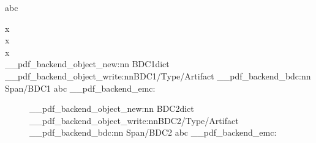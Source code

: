 \documentclass{article}
\begin{document}
abc

\vspace{44\baselineskip}

x\\x\\x\\
\ExplSyntaxOn\makeatletter
\__pdf_backend_object_new:nn  {BDC1}{dict}
\__pdf_backend_object_write:nn{BDC1}{/Type/Artifact}
\__pdf_backend_bdc:nn {Span}{/BDC1}
abc
\__pdf_backend_emc:

\begin{figure}[p]
\__pdf_backend_object_new:nn  {BDC2}{dict}
\__pdf_backend_object_write:nn{BDC2}{/Type/Artifact}
\__pdf_backend_bdc:nn {Span}{/BDC2}
abc
\__pdf_backend_emc:
\end{figure}
\ExplSyntaxOff
\end{document}
